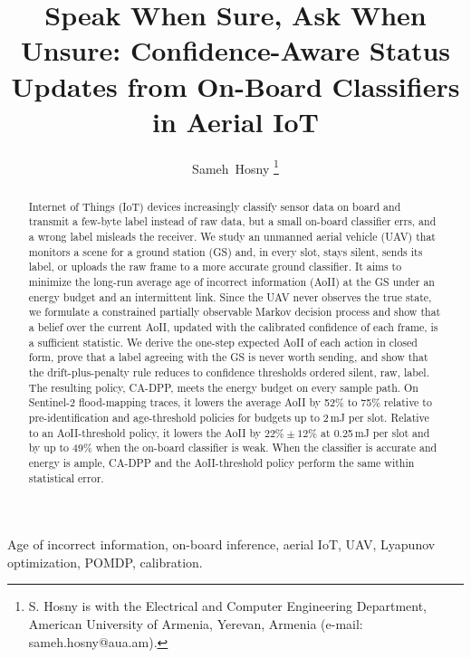 \documentclass[journal]{IEEEtran}
\theoremstyle{remark}
\begin{document}
\title{Speak When Sure, Ask When Unsure: Confidence-Aware Status Updates from On-Board Classifiers in Aerial IoT}

\author{Sameh~Hosny%
\thanks{S. Hosny is with the Electrical and Computer Engineering Department, American University of Armenia, Yerevan, Armenia (e-mail: sameh.hosny@aua.am).}}

\maketitle

\begin{abstract}
Internet of Things (IoT) devices increasingly classify sensor data on board and transmit a few-byte label instead of raw data, but a small on-board classifier errs, and a wrong label misleads the receiver. We study an unmanned aerial vehicle (UAV) that monitors a scene for a ground station (GS) and, in every slot, stays silent, sends its label, or uploads the raw frame to a more accurate ground classifier. It aims to minimize the long-run average age of incorrect information (AoII) at the GS under an energy budget and an intermittent link. Since the UAV never observes the true state, we formulate a constrained partially observable Markov decision process and show that a belief over the current AoII, updated with the calibrated confidence of each frame, is a sufficient statistic. We derive the one-step expected AoII of each action in closed form, prove that a label agreeing with the GS is never worth sending, and show that the drift-plus-penalty rule reduces to confidence thresholds ordered silent, raw, label. The resulting policy, CA-DPP, meets the energy budget on every sample path. On Sentinel-2 flood-mapping traces, it lowers the average AoII by 52\% to 75\% relative to pre-identification and age-threshold policies for budgets up to 2\,mJ per slot. Relative to an AoII-threshold policy, it lowers the AoII by $22\%\pm12\%$ at 0.25\,mJ per slot and by up to 49\% when the on-board classifier is weak. When the classifier is accurate and energy is ample, CA-DPP and the AoII-threshold policy perform the same within statistical error.
\end{abstract}

\begin{IEEEkeywords}
Age of incorrect information, on-board inference, aerial IoT, UAV, Lyapunov optimization, POMDP, calibration.
\end{IEEEkeywords}
\end{document}

